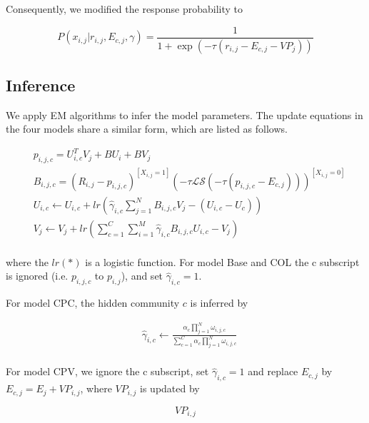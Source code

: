 \documentclass{sig-alternate}
\begin{document}
Consequently, we modified the response probability to

\begin{equation}\label{equ:responseCPV}
P(x_{i,j}|r_{i,j},E_{c,j},\gamma)=\frac{1}{1+\exp{(-\tau(r_{i,j}-E_{c,j}-VP_j))}}
\end{equation}



\subsection{Inference}

We apply EM algorithms to infer the model parameters. The update equations in the four models share a similar form, which are listed as follows. 

\begin{equation}\label{equ:update}
\begin{split}
&p_{i,j,c}=U_{i,c}^{T}V_{j} + BU_{i} + BV_{j} \\
&B_{i,j,c}=(R_{i,j}-p_{i,j,c})^{[X_{i,j}=1]}(-\tau \mathcal{LS}(-\tau(p_{i,j,c}-E_{c,j})))^{[X_{i,j}=0]} \\
&U_{i,c}\leftarrow U_{i,c}+lr(\hat{\gamma}_{i,c}\sum\limits_{j=1}^{N}B_{i,j,c}V_j-(U_{i,c}-U_c)) \\
&V_j\leftarrow V_j+lr(\sum\limits_{c=1}^{C}\sum\limits_{i=1}^{M}\hat{\gamma}_{i,c}B_{i,j,c}U_{i,c}-V_j) \\
\end{split}
\end{equation}

where the $lr(*)$ is a logistic function. For model Base and COL   the c subscript is ignored (i.e. $p_{i,j,c}$ to $p_{i,j}$), and set $\hat{\gamma}_{i,c}=1$. 

For model CPC, the hidden community $c$ is inferred by

\begin{equation}\label{equ:updateCPC}
\begin{split}
&\hat{\gamma}_{i,c}\leftarrow\frac{\alpha_c\prod_{j=1}^{N}\omega_{i,j,c}}{\sum_{c=1}^{C}\alpha_c\prod_{j=1}^{N}\omega_{i,j,c}} \\
\end{split}
\end{equation}

For  model CPV,  we ignore the c subscript, set $\hat{\gamma}_{i,c}=1$ and replace $E_{c,j}$ by $E_{c,j}=E_{j}+VP_{i,j}$, where $VP_{i,j}$ is updated by

\begin{equation}
VP_{i,j}
\end{equation}
\end{document}
